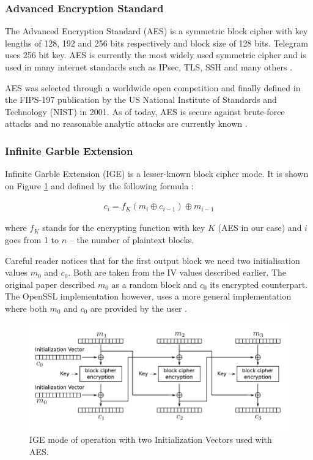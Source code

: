 \documentclass[thesis=M,english]{FITthesis}[2012/10/20]
\begin{document}
\subsubsection{Advanced Encryption Standard}

The Advanced Encryption Standard (AES) is a symmetric block cipher with key lengths of 128, 192 and 256 bits respectively and block size of 128 bits. Telegram uses 256 bit key. AES is currently the most widely used symmetric cipher and is used in many internet standards such as IPsec, TLS, SSH and many others \cite{understanding-crypto}.

AES was selected through a worldwide open competition and finally defined in the FIPS-197 publication by the US National Institute of Standards and Technology (NIST) in 2001. As of today, AES is secure against brute-force attacks and no reasonable analytic attacks are currently known \cite{understanding-crypto}.

\subsubsection{Infinite Garble Extension}

Infinite Garble Extension (IGE) is a lesser-known block cipher mode. It is shown on Figure \ref{img:crypto-regular-ige-enc} and defined by the following formula \cite{telegram-openssl-ige}:

\begin{gather*}
c_i = f_K(m_i \oplus c_{i-1}) \oplus m_{i-1}
\end{gather*}

where $f_K$ stands for the encrypting function with key $K$ (AES in our case) and $i$ goes from 1 to $n$ -- the number of plaintext blocks.

Careful reader notices that for the first output block we need two initialisation values $m_0$ and $c_0$. Both are taken from the IV values described earlier. The original paper described $m_0$ as a random block and $c_0$ its encrypted counterpart. The OpenSSL implementation however, uses a more general implementation where both $m_0$ and $c_0$ are provided by the user \cite{telegram-openssl-ige}.

\begin{figure}[htb]
	\centering
	\includegraphics[width=1\textwidth]{ige-enc.pdf}
	\caption{IGE mode of operation with two Initialization Vectors \cite{telegram-aarhus} used with AES.}
	\label{img:crypto-regular-ige-enc}
\end{figure}
\end{document}
